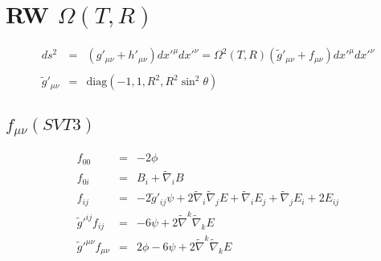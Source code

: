 \documentclass[10pt,letterpaper]{article}
\numberwithin{equation}{section}
\begin{document}
\section{RW $\Omega(T,R)$}
\begin{eqnarray}
ds^2 &=& (g'_{\mu\nu} + h'_{\mu\nu})dx'^\mu dx'^\nu = \Omega^2(T,R)(\tilde g'_{\mu\nu} + f_{\mu\nu})dx'^\mu dx'^\nu
\\ \nonumber\\
\tilde g'_{\mu\nu} &=& \text{diag}\left(-1,1,R^2,R^2\sin^2\theta\right)
\end{eqnarray}
%
\subsection{$f_{\mu\nu}(SVT3)$}
\begin{eqnarray}
f_{00} &=& -2\phi
\nonumber\\
f_{0i} &=& B_i + \tilde\nabla_i B
\nonumber\\
f_{ij} &=& -2\tilde g'_{ij} \psi + 2\tilde\nabla_i\tilde\nabla_j E + \tilde\nabla_i E_j + \tilde\nabla_j E_i + 2E_{ij}
\nonumber\\
\tilde g'^{ij} f_{ij} &=& -6\psi + 2\tilde\nabla^k\tilde\nabla_k E
\nonumber\\
\tilde g'^{\mu\nu} f_{\mu\nu} &=& 2\phi-6\psi + 2\tilde\nabla^k\tilde\nabla_k E
\end{eqnarray}
%
\end{document}
